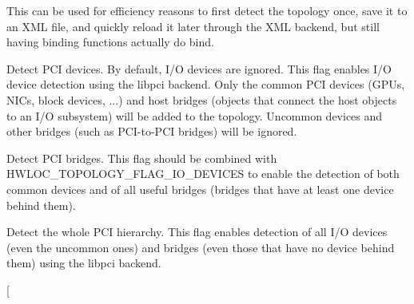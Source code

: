 \begin{Desc}
\begin{description}
This can be used for efficiency reasons to first detect the topology once, save it to an XML file, and quickly reload it later through the XML backend, but still having binding functions actually do bind. \item[{\em 
\hypertarget{a00044_ggada025d3ec20b4b420f8038d23d6e7bdea46ae25e8896278840b1800ae9ce4de41}{
HWLOC\_\-TOPOLOGY\_\-FLAG\_\-IO\_\-DEVICES}
\label{a00044_ggada025d3ec20b4b420f8038d23d6e7bdea46ae25e8896278840b1800ae9ce4de41}
}]Detect PCI devices. By default, I/O devices are ignored. This flag enables I/O device detection using the libpci backend. Only the common PCI devices (GPUs, NICs, block devices, ...) and host bridges (objects that connect the host objects to an I/O subsystem) will be added to the topology. Uncommon devices and other bridges (such as PCI-\/to-\/PCI bridges) will be ignored. \item[{\em 
\hypertarget{a00044_ggada025d3ec20b4b420f8038d23d6e7bdea426b18c349f15d7046bb391d96fa947c}{
HWLOC\_\-TOPOLOGY\_\-FLAG\_\-IO\_\-BRIDGES}
\label{a00044_ggada025d3ec20b4b420f8038d23d6e7bdea426b18c349f15d7046bb391d96fa947c}
}]Detect PCI bridges. This flag should be combined with HWLOC\_\-TOPOLOGY\_\-FLAG\_\-IO\_\-DEVICES to enable the detection of both common devices and of all useful bridges (bridges that have at least one device behind them). \item[{\em 
\hypertarget{a00044_ggada025d3ec20b4b420f8038d23d6e7bdea4a41dc181649ef81c2dcd44a54e271b9}{
HWLOC\_\-TOPOLOGY\_\-FLAG\_\-WHOLE\_\-IO}
\label{a00044_ggada025d3ec20b4b420f8038d23d6e7bdea4a41dc181649ef81c2dcd44a54e271b9}
}]Detect the whole PCI hierarchy. This flag enables detection of all I/O devices (even the uncommon ones) and bridges (even those that have no device behind them) using the libpci backend. \item[{\em 
}
\end{description}
\end{Desc}
